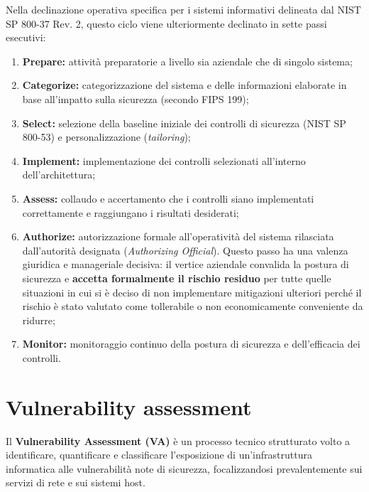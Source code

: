 \documentclass[../../main.tex]{subfiles}
\begin{document}
Nella declinazione operativa specifica per i sistemi informativi delineata dal NIST SP 800-37 Rev. 2, questo ciclo viene ulteriormente declinato in sette passi esecutivi:
\begin{enumerate}
    \item \textbf{Prepare:} attività preparatorie a livello sia aziendale che di singolo sistema;
    \item \textbf{Categorize:} categorizzazione del sistema e delle informazioni elaborate in base all'impatto sulla sicurezza (secondo FIPS 199);
    \item \textbf{Select:} selezione della baseline iniziale dei controlli di sicurezza (NIST SP 800-53) e personalizzazione (\textit{tailoring});
    \item \textbf{Implement:} implementazione dei controlli selezionati all'interno dell'architettura;
    \item \textbf{Assess:} collaudo e accertamento che i controlli siano implementati correttamente e raggiungano i risultati desiderati;
    \item \textbf{Authorize:} autorizzazione formale all'operatività del sistema rilasciata dall'autorità designata (\textit{Authorizing Official}). Questo passo ha una valenza giuridica e manageriale decisiva: il vertice aziendale convalida la postura di sicurezza e \textbf{accetta formalmente il rischio residuo} per tutte quelle situazioni in cui si è deciso di non implementare mitigazioni ulteriori perché il rischio è stato valutato come tollerabile o non economicamente conveniente da ridurre;
    \item \textbf{Monitor:} monitoraggio continuo della postura di sicurezza e dell'efficacia dei controlli.
\end{enumerate}

\section{Vulnerability assessment}
\label{sec:vulnerability_assessment}

Il \textbf{Vulnerability Assessment (VA)} è un processo tecnico strutturato volto a identificare, quantificare e classificare l'esposizione di un'infrastruttura informatica alle vulnerabilità note di sicurezza, focalizzandosi prevalentemente sui servizi di rete e sui sistemi host.
\end{document}
